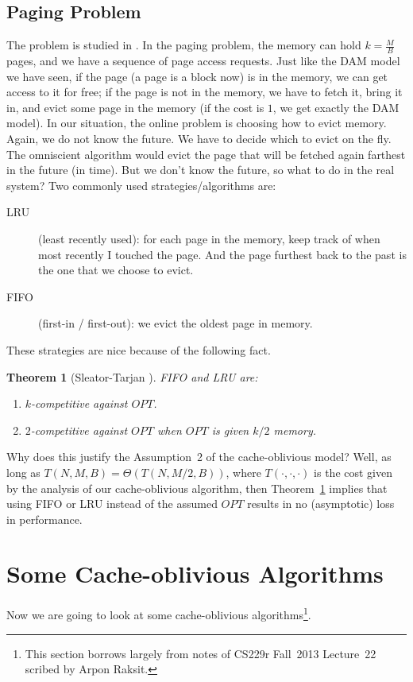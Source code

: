 \documentclass[11pt]{article}
\newtheorem{theorem}{Theorem}
\begin{document}
\subsection{Paging Problem}

The problem is studied in \cite{sleator1985amortized}.
In the paging problem, the memory can hold $k=\frac{M}{B}$ pages,
and we have a sequence of page access requests. 
Just like the DAM model we have seen, if the page (a page is a block now) is in the memory, we can get access to it for free; 
if the page is not in the memory, we have to fetch it, bring it in, and evict some page in the memory (if the cost is $1$,
we get exactly the DAM model). 
In our situation, the online problem is choosing how to evict
memory. 
Again, we do not know the future. We have to decide which to evict on the fly. 
The omniscient algorithm would evict the page that will be
fetched again farthest in the future (in time). 
But we don't know the future, so what to do in the real
system? Two commonly used strategies/algorithms are:
\begin{description}
\item[LRU] (least recently used): for each page in the memory, keep track of when most recently I touched the page. And the page furthest back to the past is the one that we choose to evict. 
\item[FIFO] (first-in / first-out): we evict the oldest page in memory. 
\end{description}

These strategies are nice because of the following fact.

\begin{theorem}[Sleator-Tarjan \cite{sleator1985amortized}]
  \label{FIFOLRU}
  FIFO and LRU are:
  \begin{enumerate}
  \item $k$-competitive against $OPT$.
  \item $2$-competitive against $OPT$ when $OPT$ is given $k/2$
    memory.
  \end{enumerate}
\end{theorem}

Why does this justify the Assumption~2 of the cache-oblivious model? Well, as long as
$T(N,M,B) =\Theta(T(N,M/2,B))$, where $T(\cdot,\cdot,\cdot)$ is the cost given by
the analysis of our cache-oblivious algorithm, then Theorem~\ref{FIFOLRU} 
implies that using FIFO or LRU instead of the assumed
$OPT$ results in no (asymptotic) loss in performance.

\section{Some Cache-oblivious Algorithms}
Now we are going to look at some cache-oblivious algorithms\footnote{This section borrows largely from notes of CS229r Fall~2013 Lecture~22 scribed by Arpon Raksit.}.
\end{document}
